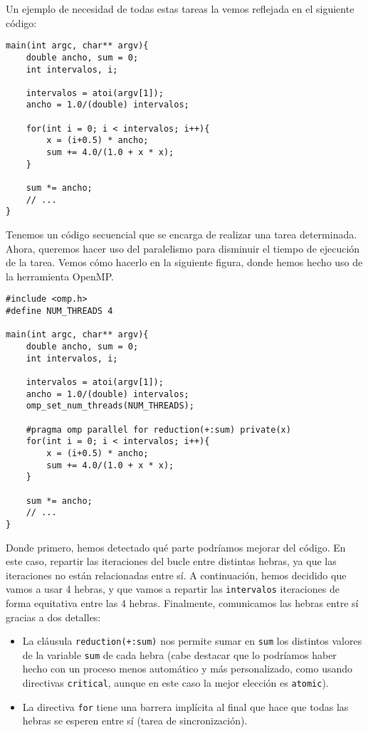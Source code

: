 Un ejemplo de necesidad de todas estas tareas la vemos reflejada en el siguiente código:
    \begin{verbatim}
main(int argc, char** argv){
    double ancho, sum = 0;
    int intervalos, i;
    
    intervalos = atoi(argv[1]);
    ancho = 1.0/(double) intervalos;

    for(int i = 0; i < intervalos; i++){
        x = (i+0.5) * ancho;
        sum += 4.0/(1.0 + x * x);
    }

    sum *= ancho;
    // ...
}
    \end{verbatim}
Tenemos un código secuencial que se encarga de realizar una tarea determinada. Ahora, queremos hacer uso del paralelismo para disminuir el tiempo de ejecución de la tarea. Vemos cómo hacerlo en la siguiente figura, donde hemos hecho uso de la herramienta OpenMP.
    \begin{verbatim}
#include <omp.h>
#define NUM_THREADS 4

main(int argc, char** argv){
    double ancho, sum = 0;
    int intervalos, i;
    
    intervalos = atoi(argv[1]);
    ancho = 1.0/(double) intervalos;
    omp_set_num_threads(NUM_THREADS);

    #pragma omp parallel for reduction(+:sum) private(x)
    for(int i = 0; i < intervalos; i++){
        x = (i+0.5) * ancho;
        sum += 4.0/(1.0 + x * x);
    }

    sum *= ancho;
    // ...
}
    \end{verbatim}
Donde primero, hemos detectado qué parte podríamos mejorar del código. En este caso, repartir las iteraciones del bucle entre distintas hebras, ya que las iteraciones no están relacionadas entre sí. A continuación, hemos decidido que vamos a usar 4 hebras, y que vamos a repartir las \verb|intervalos| iteraciones de forma equitativa entre las 4 hebras. Finalmente, comunicamos las hebras entre sí gracias a dos detalles:
\begin{itemize}
    \item La cláusula \verb|reduction(+:sum)| nos permite sumar en \verb|sum| los distintos valores de la variable \verb|sum| de cada hebra (cabe destacar que lo podríamos haber hecho con un proceso menos automático y más personalizado, como usando directivas \verb|critical|, aunque en este caso la mejor elección es \verb|atomic|).
    \item La directiva \verb|for| tiene una barrera implícita al final que hace que todas las hebras se esperen entre sí (tarea de sincronización).
\end{itemize}


